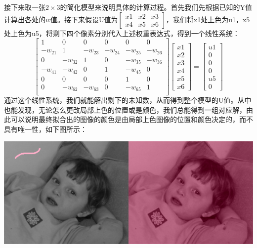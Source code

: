 \documentclass[12pt, a4paper, oneside]{report}
\begin{document}
	
	接下来取一张$2\times3$的简化模型来说明具体的计算过程。首先我们先根据已知的Y值计算出各处的$w$值。接下来假设U值为$\left[ \begin{array}{ccc}
		x1 & x2 & x3\\
		x4 & x5 & x6
	\end{array}\right]$，我们将x1处上色为u1，x5处上色为u5，将剩下四个像素分别代入上述权重表达式，得到一个线性系统：
	$$\left[ \begin{array}{cccccc}
		1 & 0 & 0 & 0 & 0 & 0\\
		-w_{21} & 1 & -w_{23} & -w_{24} & -w_{25} & -w_{26}\\
		0 & -w_{32} & 1 & 0 & -w_{35} & -w_{36}\\
		-w_{41} & -w_{42} & 0 & 1 & -w_{45} & 0\\
		0 & 0 & 0 & 0 & 1 & 0\\
		0 & -w_{62} & -w_{63} & 0 & -w_{65} & 1\\
	\end{array}\right]
	\left[ \begin{array}{c}
		x1\\
		x2\\
		x3\\
		x4\\
		x5\\
		x6\end{array}\right] = 
	\left[ \begin{array}{c}
		u1\\
		0\\
		0\\
		0\\
		u5\\
		0\end{array}\right]
		$$
	通过这个线性系统，我们就能解出剩下的未知数，从而得到整个模型的U值。从中也能发现，无论怎么更改局部上色的位置或是颜色，我们总能得到一组对应解，由此可以说明最终拟合出的图像的颜色是由局部上色图像的位置和颜色决定的，而不具有唯一性，如下图所示：
	\centerline{
	\includegraphics[scale=0.6]{baby_colorized1.png}
	}
	
\end{document}
